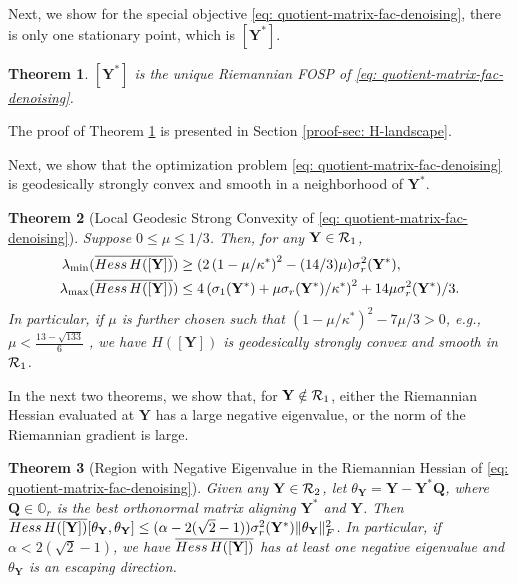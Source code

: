 \documentclass[11pt]{article}
\newtheorem{Theorem}{Theorem}
\newcommand{\0}{{\mathbf{0}}}
\newcommand{\1}{{\mathbf{1}}}
\newcommand{\Q}{{\mathbf{Q}}}
\newcommand{\Y}{{\mathbf{Y}}}
\newcommand{\cR}{{\cal R}}
\newcommand{\Hess}{{\rm Hess}}
\newcommand{\F}{{\rm F}}
\newcommand{\bbO}{\mathbb{O}}
\newcommand{\nc}{\normalcolor}
\begin{document}
Next, we show for the special objective \eqref{eq: quotient-matrix-fac-denoising}, there is only one stationary point, which is $[\Y^*]$. 
\begin{Theorem} \label{th: unique-FOSP}
	$[\Y^*]$ is the unique Riemannian FOSP of \eqref{eq: quotient-matrix-fac-denoising}.
\end{Theorem}

The proof of Theorem \ref{th: unique-FOSP} is presented in Section \ref{proof-sec: H-landscape}.

Next, we show that the optimization problem \eqref{eq: quotient-matrix-fac-denoising} is geodesically strongly convex and smooth in a neighborhood of $\Y^*$.
\begin{Theorem}[Local Geodesic Strong Convexity of \eqref{eq: quotient-matrix-fac-denoising}] \label{th: H-geodesic-strong-convex} Suppose $ 0\leq  \mu \leq 1/3$. Then, for any $\Y \in \cR_1$,
\begin{equation*}
	\begin{split}
		\lambda_{\min}(\overline{\Hess\, H([\Y])} ) & \geq ( 2 \left( 1 - \mu/ \kappa^* \right)^2 - (14/3) \mu  ) \sigma^2_r(\Y^*) , \\
		 \lambda_{\max}(\overline{\Hess\, H([\Y])} ) & \leq   4\left(   \sigma_1(\Y^*) + \mu \sigma_r(\Y^*)/\kappa^* \right)^2 + 14\mu \sigma^2_r(\Y^*)/3.
	\end{split}
\end{equation*} In particular, if $\mu$ is further chosen such that $ \left( 1 - \mu /\kappa^* \right)^2 - 7\mu/3 > 0$, e.g., $\mu < \frac{13 - \sqrt{133}}{6}$ , we have $H([\Y])$ is geodesically strongly convex and smooth in $\cR_1$.
\end{Theorem}

In the next two theorems, we show that, for $\Y \notin \cR_1 $, either the Riemannian Hessian evaluated at $\Y$ has a large negative eigenvalue, or the norm of the Riemannian gradient is large.
\begin{Theorem}[Region with Negative Eigenvalue in the Riemannian Hessian of \eqref{eq: quotient-matrix-fac-denoising}] \label{th: H-negative-eigenvalue-region} Given any $\Y \in \cR_2$, let $\theta_\Y = \Y - \Y^* \Q $, where $\Q \in \bbO_r$ is the best orthonormal \nc matrix aligning $\Y^*$ and $\Y$. Then
$\overline{ \Hess\, H([\Y])}[ \theta_\Y, \theta_\Y  ] \leq  (\alpha - 2 ( \sqrt{2} - 1 ))  \sigma^2_r(\Y^*) \|\theta_\Y\|_\F^2$. In particular, if $\alpha < 2(\sqrt{2} - 1)$, we have $\overline{ \Hess\, H([\Y])}$ has at least one negative eigenvalue and $\theta_\Y$ is an escaping direction. 
\end{Theorem}
\end{document}
